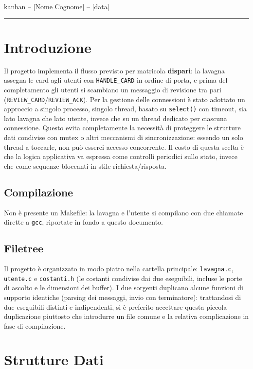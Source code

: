 \documentclass{article}
\begin{document}
\begin{flushleft}
\normalsize
kanban -- [Nome Cognome] -- [data]\\
\rule{\textwidth}{0.4pt}
\end{flushleft}

\section{Introduzione}
Il progetto implementa il flusso previsto per matricola \textbf{dispari}: la lavagna assegna le card agli utenti con \verb|HANDLE_CARD| in ordine di porta, e prima del completamento gli utenti si scambiano un messaggio di revisione tra pari (\verb|REVIEW_CARD|/\verb|REVIEW_ACK|).
Per la gestione delle connessioni è stato adottato un approccio a singolo processo, singolo thread, basato su \verb|select()| con timeout, sia lato lavagna che lato utente, invece che su un thread dedicato per ciascuna connessione. Questo evita completamente la necessità di proteggere le strutture dati condivise con mutex o altri meccanismi di sincronizzazione: essendo un solo thread a toccarle, non può esserci accesso concorrente. Il costo di questa scelta è che la logica applicativa va espressa come controlli periodici sullo stato, invece che come sequenze bloccanti in stile richiesta/risposta.
\subsection{Compilazione}
Non è presente un Makefile: la lavagna e l'utente si compilano con due chiamate dirette a \verb|gcc|, riportate in fondo a questo documento.
\subsection{Filetree}
Il progetto è organizzato in modo piatto nella cartella principale: \verb|lavagna.c|, \verb|utente.c| e \verb|costanti.h| (le costanti condivise dai due eseguibili, incluse le porte di ascolto e le dimensioni dei buffer). I due sorgenti duplicano alcune funzioni di supporto identiche (parsing dei messaggi, invio con terminatore): trattandosi di due eseguibili distinti e indipendenti, si è preferito accettare questa piccola duplicazione piuttosto che introdurre un file comune e la relativa complicazione in fase di compilazione.

\section{Strutture Dati}
\end{document}
